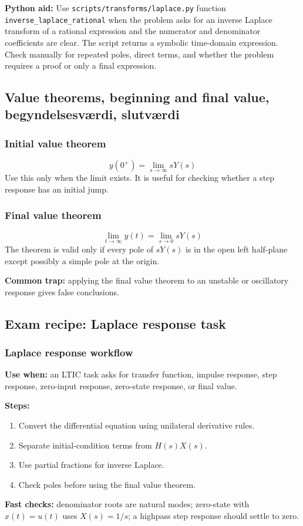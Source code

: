 \textbf{Python aid:} Use \texttt{scripts/transforms/laplace.py} function \texttt{inverse\_laplace\_rational} when the problem asks for an inverse Laplace transform of a rational expression and the numerator and denominator coefficients are clear. The script returns a symbolic time-domain expression. Check manually for repeated poles, direct terms, and whether the problem requires a proof or only a final expression.

\subsection{Value theorems, beginning and final value, begyndelsesværdi, slutværdi}

\subsubsection{Initial value theorem}
\[
y(0^+)=\lim_{s\to\infty}sY(s)
\]
Use this only when the limit exists. It is useful for checking whether a step response has an initial jump.

\subsubsection{Final value theorem}
\[
\lim_{t\to\infty}y(t)=\lim_{s\to0}sY(s)
\]
The theorem is valid only if every pole of \(sY(s)\) is in the open left half-plane except possibly a simple pole at the origin.

\textbf{Common trap:} applying the final value theorem to an unstable or oscillatory response gives false conclusions.

\subsection{Exam recipe: Laplace response task}

\subsubsection{Laplace response workflow}
\textbf{Use when:} an LTIC task asks for transfer function, impulse response, step response, zero-input response, zero-state response, or final value.

\textbf{Steps:}
\begin{enumerate}
    \item Convert the differential equation using unilateral derivative rules.
    \item Separate initial-condition terms from \(H(s)X(s)\).
    \item Use partial fractions for inverse Laplace.
    \item Check poles before using the final value theorem.
\end{enumerate}

\textbf{Fast checks:} denominator roots are natural modes; zero-state with \(x(t)=u(t)\) uses \(X(s)=1/s\); a highpass step response should settle to zero.
